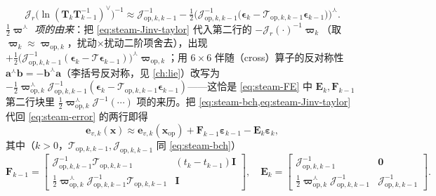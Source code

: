\begin{equation}
  \boldsymbol{\mathcal{J}}_r\!\big(\ln(\mathbf{T}_k\mathbf{T}_{k-1}^{-1})^\vee\big)^{-1}\approx\boldsymbol{\mathcal{J}}_{\mathrm{op},k,k-1}^{-1}-\tfrac12\Big(\boldsymbol{\mathcal{J}}_{\mathrm{op},k,k-1}^{-1}\big(\boldsymbol{\epsilon}_k-\boldsymbol{\mathcal{T}}_{\mathrm{op},k,k-1}\boldsymbol{\epsilon}_{k-1}\big)\Big)^\curlywedge.
  \label{eq:steam-Jinv-taylor}
\end{equation}
\emph{$\tfrac12\boldsymbol{\varpi}^\curlywedge$ 项的由来}：把 \cref{eq:steam-Jinv-taylor} 代入第二行的 $-\boldsymbol{\mathcal{J}}_r(\cdot)^{-1}\boldsymbol{\varpi}_k$（取 $\boldsymbol{\varpi}_k\approx\boldsymbol{\varpi}_{\mathrm{op},k}$，扰动$\times$扰动二阶项舍去），出现 $+\tfrac12\big(\boldsymbol{\mathcal{J}}_{\mathrm{op},k,k-1}^{-1}(\boldsymbol{\epsilon}_k-\boldsymbol{\mathcal{T}}\boldsymbol{\epsilon}_{k-1})\big)^\curlywedge\boldsymbol{\varpi}_{\mathrm{op},k}$；用 $6\times6$ 伴随（cross）算子的反对称性 $\mathbf{a}^\curlywedge\mathbf{b}=-\mathbf{b}^\curlywedge\mathbf{a}$（李括号反对称，见 \cref{ch:lie}）改写为 $-\tfrac12\boldsymbol{\varpi}_{\mathrm{op},k}^\curlywedge\boldsymbol{\mathcal{J}}_{\mathrm{op},k,k-1}^{-1}(\boldsymbol{\epsilon}_k-\boldsymbol{\mathcal{T}}_{\mathrm{op},k,k-1}\boldsymbol{\epsilon}_{k-1})$——这恰是 \cref{eq:steam-FE} 中 $\mathbf{E}_k,\mathbf{F}_{k-1}$ 第二行块里 $\tfrac12\boldsymbol{\varpi}_{\mathrm{op},k}^\curlywedge\boldsymbol{\mathcal{J}}^{-1}(\cdots)$ 项的来历。把 \cref{eq:steam-bch,eq:steam-Jinv-taylor} 代回 \cref{eq:steam-error} 的两行即得
\begin{equation}
  \mathbf{e}_{v,k}(\mathbf{x})\approx\mathbf{e}_{v,k}(\mathbf{x}_{\mathrm{op}})+\mathbf{F}_{k-1}\boldsymbol{\varepsilon}_{k-1}-\mathbf{E}_k\boldsymbol{\varepsilon}_k,
  \label{eq:steam-lin}
\end{equation}
其中（$k>0$，$\boldsymbol{\mathcal{T}}_{\mathrm{op},k,k-1},\boldsymbol{\mathcal{J}}_{\mathrm{op},k,k-1}$ 同 \cref{eq:steam-bch}）
\begin{equation}
  \mathbf{F}_{k-1}=\begin{bmatrix}\boldsymbol{\mathcal{J}}_{\mathrm{op},k,k-1}^{-1}\boldsymbol{\mathcal{T}}_{\mathrm{op},k,k-1}&(t_k-t_{k-1})\mathbf{I}\\[2pt]\tfrac12\boldsymbol{\varpi}_{\mathrm{op},k}^\curlywedge\boldsymbol{\mathcal{J}}_{\mathrm{op},k,k-1}^{-1}\boldsymbol{\mathcal{T}}_{\mathrm{op},k,k-1}&\mathbf{I}\end{bmatrix},\quad
  \mathbf{E}_k=\begin{bmatrix}\boldsymbol{\mathcal{J}}_{\mathrm{op},k,k-1}^{-1}&\mathbf{0}\\[2pt]\tfrac12\boldsymbol{\varpi}_{\mathrm{op},k}^\curlywedge\boldsymbol{\mathcal{J}}_{\mathrm{op},k,k-1}^{-1}&\boldsymbol{\mathcal{J}}_{\mathrm{op},k,k-1}^{-1}\end{bmatrix}.
  \label{eq:steam-FE}
\end{equation}
